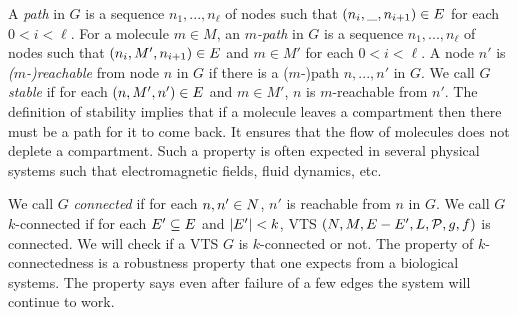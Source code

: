 %
%
\vspace{0.2cm}
\noindent
A {\em path} in $G$ is a sequence $n_1,...,n_\ell$ of nodes 
such that $(n_i,\_,n_{i+1}) \in E$ for each $ 0 < i < \ell$.
%
For a molecule $m \in M$,
an {\em $m$-path} in $G$ is a sequence $n_1,...,n_\ell$ of nodes 
such that $(n_i,M',n_{i+1}) \in E$ and $m \in M'$ for
each $ 0 < i < \ell$.
%
A node $n'$ is {\em ($m$-)reachable} from node $n$ in $G$ if there is a ($m$-)path
$n,...,n'$ in $G$.
%
%
We call $G$ {\em stable} if for each $(n,M',n') \in E$ and $m \in M'$,
$n$ is $m$-reachable from $n'$.
%
The definition of stability implies that if a molecule leaves a
compartment then there must be a path for it to come back.
%
It ensures that the flow of molecules does not deplete a
compartment.
%
Such a property is often expected in several physical systems
such that electromagnetic fields, fluid dynamics, etc.

%
We call $G$ {\em connected} if for each $n,n' \in N$,
$n'$ is reachable from $n$ in $G$.
%
We call $G$ $k$-connected if for each $E' \subseteq E$ and
$|E'| < k$, VTS
$(N,M,E-E',L,\mathcal{P},g,f)$ is connected.
%
We will check if a VTS $G$ is $k$-connected or not.
%
The property of $k$-connectedness is a robustness property that one
expects from a biological systems.
%
The property says even after failure of a few edges the system will continue to work.

